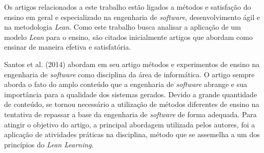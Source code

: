 Os artigos relacionados a este trabalho estão ligados a métodos e satisfação do ensino em geral e especializado na engenharia de \textit{software}, desenvolvimento ágil e na metodologia \textit{Lean}. Como este trabalho busca analisar a aplicação de um modelo \textit{Lean} para o ensino, são citados inicialmente artigos que abordam como ensinar de maneira efetiva e satisfatória.


\nocite{EnsinoEng2014}Santos et al. (2014) abordam em seu artigo métodos e experimentos de ensino na engenharia de \textit{software} como disciplina da área de informática. O artigo sempre aborda o fato do amplo conteúdo que a engenharia de \textit{software} abrange e sua importância para a qualidade dos sistemas gerados. Devido a grande quantidade de conteúdo, se tornou necessário a utilização de métodos diferentes de ensino na tentativa de repassar a base da engenharia de \textit{software} de forma adequada. Para atingir o objetivo do artigo, a principal abordagem utilizada pelos autores, foi a aplicação de atividades práticas na disciplina, método que se assemelha a um dos princípios do \textit{Lean Learning}.


